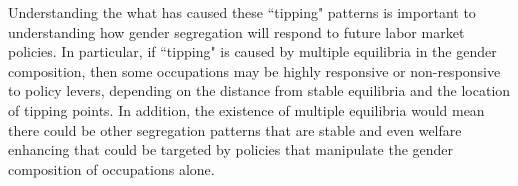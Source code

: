 \documentclass[11pt]{article}
\begin{document}



Understanding the what has caused these ``tipping" patterns is important to understanding how gender segregation will respond to future labor market policies. In particular, if ``tipping" is caused by multiple equilibria in the gender composition, then some occupations may be highly responsive or non-responsive to policy levers, depending on the distance from stable equilibria and the location of tipping points. In addition, the existence of multiple equilibria would mean there could be other segregation patterns that are stable and even welfare enhancing that could be targeted by policies that manipulate the gender composition of occupations alone.
\end{document}
